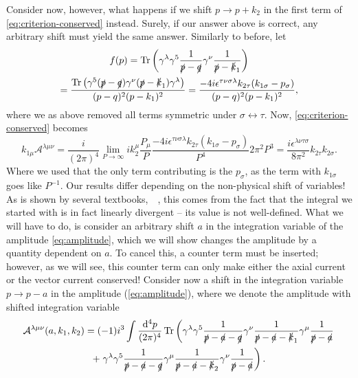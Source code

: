 Consider now, however, what happens if we shift $p\to p+k_2$ in the first term of \cref{eq:criterion-conserved} instead.
Surely, if our answer above is correct, any arbitrary shift must yield the same answer.
Similarly to before, let
\begin{multline}
  f(p) = \operatorname{Tr}\left(\gamma^{\lambda }\gamma^5 \frac{1}{\slashed{p} - \slashed{q}} \gamma^{\nu } \frac{1}{\slashed{p} - \slashed{k}_{1}} \right)\\
  = \frac{\operatorname{Tr} \left( \gamma ^5 (\slashed{p}-\slashed{q}) \gamma ^{\nu } (\slashed{p}-\slashed{k}_1)\gamma ^{\lambda } \right)}{
   (p-q)^2(p-k_1)^2
  }
  =
  \frac{-4i\epsilon ^{\tau \nu \sigma \lambda } k_{2\tau } (k_{1\sigma } - p_{\sigma })}{
   (p-q)^2(p-k_1)^2
  },
\end{multline}
where we as above removed all terms symmetric under $\sigma \leftrightarrow \tau$.
Now, \cref{eq:criterion-conserved} becomes
\begin{equation}
  k_{1\mu } \mathcal{A}^{\lambda \mu \nu } =
  \frac{i}{(2\pi)^4} \lim_{P \to \infty } ik_2^{\mu } \frac{P_{\mu }}{P}
  \frac{{-4i\epsilon ^{\tau \nu \sigma \lambda } k_{2\tau } (k_{1\sigma }-p_{\sigma })}}{P^{4}}
  2\pi^2P^3
  = \frac{ i \epsilon ^{\lambda \nu \tau \sigma } }{8\pi^2}  k_{2\tau }k_{2\sigma }.
\end{equation}
Where we used that the only term contributing is the $p_{\sigma }$, as the term with $k_{1\sigma }$ goes like $P^{-1}$.
Our results differ depending on the non-physical shift of variables!
As is shown by several textbooks,~\cite{zeeQuantumFieldTheory2010}~\cite{kachelriessQuantumFieldsHubble2018}, this comes from the fact that the integral we started with is in fact linearly divergent -- its value is not well-defined.
What we will have to do, is consider an arbitrary shift $a$ in the integration variable of the amplitude \cref{eq:amplitude}, which we will show changes the amplitude by a quantity dependent on $a$.
To cancel this, a counter term must be inserted;
however, as we will see, this counter term can only make either the axial current or the vector current conserved!
Consider now a shift in the integration variable $p \to p - a$ in the amplitude (\ref{eq:amplitude}), where we denote the amplitude with shifted integration variable
\begin{multline}
  \label{eq:amplitude-shift}
  \mathcal{A}^{\lambda \mu \nu}(a, k_1, k_2) =
  (-1) i^3 \int \frac{\mathrm{d}^4p}{(2\pi)^{4}}
  \operatorname{Tr} \left(
    \gamma ^{\lambda } \gamma ^5 \frac{1}{\slashed{p} - \slashed{a} - \slashed{q}} \gamma ^{\nu } \frac{1}{\slashed{p} - \slashed{a}- \slashed{k}_{1}} \gamma ^{\mu } \frac{1}{\slashed{p} - \slashed{a}} \right.\\
    +
   \left. \gamma ^{\lambda }\gamma ^5 \frac{1}{\slashed{p} - \slashed{a}- \slashed{q}} \gamma ^{\mu } \frac{1}{\slashed{p} - \slashed{a} - \slashed{k}_2} \gamma ^{\nu } \frac{1}{\slashed{p} - \slashed{a}}
  \right).
\end{multline}

